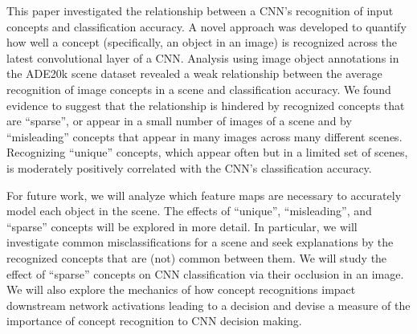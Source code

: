 \documentclass{article}
\begin{document}
This paper investigated the relationship between a CNN's recognition of input concepts and classification
accuracy. A novel approach was developed to quantify how well a concept (specifically, an object in an image) is recognized across the latest convolutional layer of a CNN. Analysis using image object
annotations in the ADE20k scene dataset revealed a weak relationship between the average 
recognition of image concepts in a scene and classification accuracy. We found evidence to suggest 
that the relationship is hindered by recognized concepts that are ``sparse'', or appear in a small number
of images of a scene and by ``misleading'' concepts that appear in many images across
many different scenes. Recognizing ``unique'' concepts, which appear often but in a limited set of scenes, 
is moderately positively correlated with the CNN's classification accuracy. 

For future work, we will analyze which feature maps are necessary to accurately model each object in the scene.
The effects of ``unique'', ``misleading'', and ``sparse'' concepts will be explored in more detail. 
In particular, we will investigate common misclassifications for a 
scene and seek explanations by the recognized concepts that are (not) common
between them.
We will study the effect of ``sparse'' concepts on CNN classification via their
occlusion in an image. We will also explore the mechanics of how concept recognitions 
impact downstream network activations leading to a decision and devise a measure of the 
importance of concept recognition to CNN decision making. 




\end{document}

